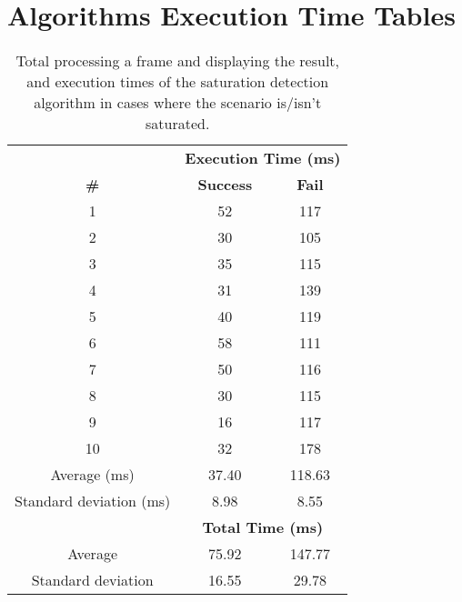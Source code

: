 \chapter{Algorithms Execution Time Tables}
\label{app:exec_times}

\begin{table}[h]
	\footnotesize
    \begin{center}
    \begin{tabular}{c c c}
    \hline 
    &\multicolumn{2}{c}{\textbf{Execution Time (ms)}}\\
    \textbf{\#} &
    \textbf{Success} & \textbf{Fail}\\ \hline
	1 &	52 &	117\\
	2 &	30 &	105\\
	3 &	35 &	115\\
	4 &	31 &	139\\
	5 &	40 &	119\\
	6 &	58 &	111\\
	7 &	50 &	116\\
	8 &	30 & 	115\\
	9 &	16 &	117\\
	10 &	32 &	178\\
	\hline
	Average (ms) &	37.40&	118.63 \\
	Standard deviation (ms) &	8.98&	8.55\\
	\hline	
	& \multicolumn{2}{c}{\textbf{Total Time (ms)}}\\
    \hline
    Average	& 75.92 & 147.77 \\
    Standard deviation & 16.55 & 29.78\\
    \hline
    \end{tabular}
	\end{center}
	\caption{Total processing a frame and displaying the result, and execution times of the saturation detection algorithm in cases where the scenario is/isn't saturated.}
	\label{tab:sat}
\end{table}

